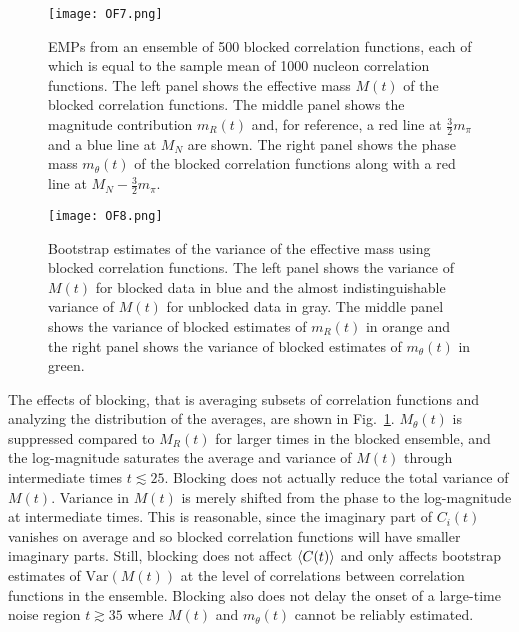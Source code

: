 %
\begin{figure}[!ht]
  \centering
  \texttt{[image: OF7.png]}
  \caption{
  EMPs from an ensemble of 500 blocked correlation functions,
  each of which is equal to the sample mean of 1000 nucleon correlation functions. 
  The left panel shows the effective mass $M(t)$ of the blocked correlation functions. 
  The middle panel shows the magnitude contribution $m_R(t)$ and, for reference, 
  a red line at $\frac{3}{2}m_\pi$ and a blue line at $M_N$ are shown. 
  The right panel shows the phase mass $m_\theta(t)$ of the blocked correlation functions 
  along with a red line at $M_N - \frac{3}{2}m_\pi$.
  }
  \label{BlockedRTh_EM}
\end{figure}
%
%
\begin{figure}[!ht]
  \centering
  \texttt{[image: OF8.png]}
  \caption{
  Bootstrap estimates of the variance of the effective mass using blocked correlation functions. 
The left panel shows the variance of $M(t)$ for blocked data in blue and the almost indistinguishable variance of $M(t)$ for unblocked data in gray. The middle panel shows the variance of blocked estimates of $m_R(t)$ in orange and the right panel shows the variance of blocked estimates of $m_\theta(t)$ in green.}
  \label{BlockedRTh_EMErrors}
\end{figure}
%



The effects of blocking, that is averaging subsets of correlation functions and analyzing the distribution of the averages, 
are shown in Fig.~\ref{BlockedRTh_EM}. 
$M_\theta(t)$ is suppressed compared to $M_R(t)$ for larger times in the blocked ensemble, and the log-magnitude 
saturates the average and variance of $M(t)$ through intermediate times $t\lesssim 25$. 
Blocking does not actually reduce the total variance of $M(t)$. 
Variance in $M(t)$ is merely shifted from the phase to the log-magnitude at intermediate times. 
This is reasonable, since the imaginary part of $C_i(t)$ vanishes on average and so blocked correlation functions 
will have smaller imaginary parts. Still, blocking does not affect $\left< C(t) \right>$ and only affects bootstrap 
estimates of $\text{Var}(M(t))$ at the level of correlations between correlation functions in the ensemble. 
Blocking also does not delay the onset of a large-time noise region $t\gtrsim 35$ where $M(t)$ and 
$m_\theta(t)$ cannot be reliably estimated.




